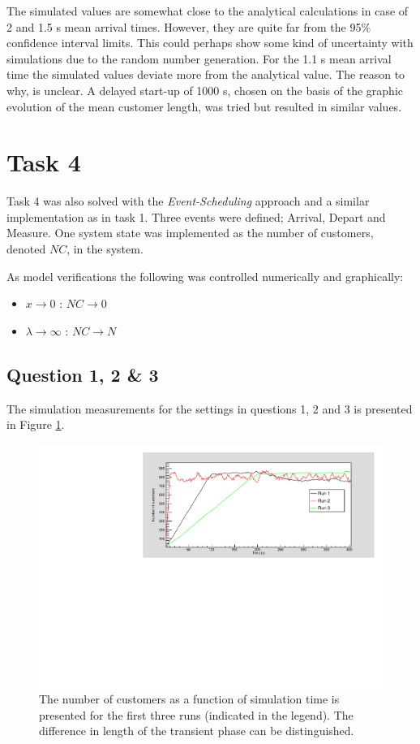 \documentclass[]{article}
\begin{document}
The simulated values are somewhat close to the analytical calculations in case of 2 and 1.5 s mean arrival times.
However, they are quite far from the 95\% confidence interval limits.
This could perhaps show some kind of uncertainty with simulations due to the random number generation.
For the 1.1 s mean arrival time the simulated values deviate more from the analytical value.
The reason to why, is unclear.
A delayed start-up of 1000 s, chosen on the basis of the graphic evolution of the mean customer length, was tried but resulted in similar values.

\section{Task 4}
Task 4 was also solved with the {\it Event-Scheduling} approach and a similar implementation as in task 1.
Three events were defined; Arrival, Depart and Measure.
One system state was implemented as the number of customers, denoted $NC$,  in the system.

As model verifications the following was controlled numerically and graphically:
\begin{itemize}
  \item $ x \rightarrow 0$ : $ NC \rightarrow 0$
  \item $\lambda \rightarrow \infty$ : $ NC \rightarrow N$
\end{itemize}

\subsection{Question 1, 2 \& 3}
The simulation measurements for the settings in questions 1, 2 and 3 is presented in Figure \ref{fig:task4}.

\begin{figure}[H]
  \centering
  \includegraphics[width=\textwidth]{task4a.pdf}
  \caption{The number of customers as a function of simulation time is presented for the first three runs (indicated in the legend). The difference in length of the transient phase can be distinguished. }
  \label{fig:task4}
\end{figure}
\end{document}
